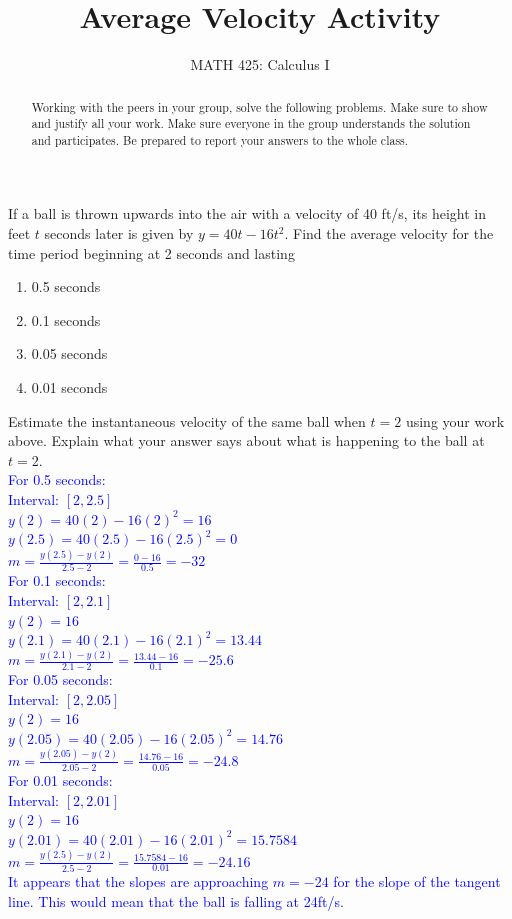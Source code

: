 \documentclass{ximera}
\title{Average Velocity Activity}
\author{MATH 425: Calculus I}
\begin{document}
\begin{abstract}
    Working with the peers in your group, solve the following problems. Make sure to show and justify all your work. Make sure everyone in the group understands the solution and participates. Be prepared to report your answers to the whole class. 
\end{abstract}
\maketitle


\begin{exercise}
 If a ball is thrown upwards into the air with a velocity of 40 ft/s, its height in feet $t$ seconds later is given by $y=40t-16t^2$.  
  Find the average velocity for the time period beginning at 2 seconds and lasting 
     \begin{enumerate}
         \item 0.5 seconds
         \item 0.1 seconds
         \item 0.05 seconds
         \item 0.01 seconds
     \end{enumerate}
 Estimate the instantaneous velocity of the same ball when $t=2$ using your work above.  Explain what your answer says about what is happening to the ball at $t=2$. \\

 \textcolor{blue}{For 0.5 seconds: \\
     Interval: $[2, 2.5]$\\
     $y(2)=40(2)-16(2)^2=16$\\
     $y(2.5)=40(2.5)-16(2.5)^2=0$\\
     $m=\frac{y(2.5)-y(2)}{2.5-2}=\frac{0-16}{0.5}=-32$\\
     For 0.1 seconds: \\
     Interval: $[2, 2.1]$\\
     $y(2)=16$\\
     $y(2.1)=40(2.1)-16(2.1)^2=13.44$\\
     $m=\frac{y(2.1)-y(2)}{2.1-2}=\frac{13.44-16}{0.1}=-25.6$\\
     For 0.05 seconds: \\
     Interval: $[2, 2.05]$\\
     $y(2)=16$\\
     $y(2.05)=40(2.05)-16(2.05)^2=14.76$\\
     $m=\frac{y(2.05)-y(2)}{2.05-2}=\frac{14.76-16}{0.05}=-24.8$\\
     For 0.01 seconds: \\
     Interval: $[2, 2.01]$\\
     $y(2)=16$\\
     $y(2.01)=40(2.01)-16(2.01)^2=15.7584$\\
     $m=\frac{y(2.5)-y(2)}{2.5-2}=\frac{15.7584-16}{0.01}=-24.16$\\
     It appears that the slopes are approaching $m=-24$ for the slope of the tangent line.  This would mean that the ball is falling at 24ft/s.}
\end{exercise}
\end{document}
